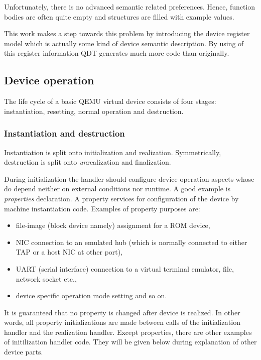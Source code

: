 \documentclass[conference,compsoc,a4paper]{IEEEtran}
\begin{document}
Unfortunately, there is no advanced semantic related preferences.
Hence, function bodies are often quite empty and structures are filled with
example values.

This work makes a step towards this problem by introducing the device register
model which is actually some kind of device semantic description.
By using of this register information QDT generates much more code than
originally.

\subsection{Device operation}

The life cycle of a basic QEMU virtual device consists of four stages:
instantiation, resetting, normal operation and destruction.

\subsubsection{Instantiation and destruction}
Instantiation is split onto initialization and realization.
Symmetrically, destruction is split onto \textit{un}realization and finalization.

During initialization the handler should configure device operation aspects
whose do depend neither on external conditions nor runtime.
A good example is \textit{properties} declaration.
A property services for configuration of the device by machine instantiation
code.
Examples of property purposes are:

\begin{itemize}
    \item file-image (block device namely) assignment for a ROM device,
    \item NIC connection to an emulated hub (which is normally connected
    to either TAP or a host NIC at other port),
    \item UART (serial interface) connection to a virtual terminal
    emulator, file, network socket etc.,
    \item device specific operation mode setting and so on.
\end{itemize}

It is guaranteed that no property is changed after device is realized.
In other words, all property initializations are made between calls of the
initialization handler and the realization handler.
Except properties, there are other examples of initilization handler code.
They will be given below during explanation of other device parts.
\end{document}
